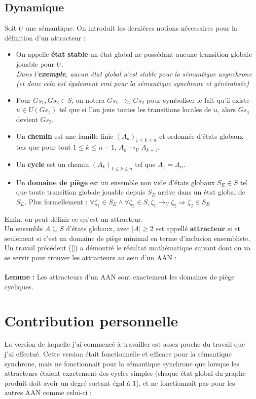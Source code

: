 \documentclass[12pt,a4paper]{article}
\begin{document}
\subsection{Dynamique}
Soit $U$ une sémantique. On introduit les dernières notions nécessaires pour la définition d'un attracteur :
\begin{itemize}
	\item On appelle \textbf{état stable} un état global ne possédant aucune transition globale jouable pour $U$.\\
	\emph{Dans l'\textbf{exemple}, aucun état global n'est stable pour la sémantique asynchrone (et donc cela est également vrai pour la sémantique synchrone et généralisée)}
	\item Pour $Gs_1,Gs_2\in S$, on notera $Gs_1\rightarrow _UGs_2$ pour symboliser le fait qu'il existe $u\in U(Gs_1)$ tel que si l'on joue toutes les transitions locales de $u$, alors $Gs_1$ devient $Gs_2$.
	\item Un \textbf{chemin} est une famille finie $(A_k)_{1\leq k\leq n}$ et ordonnée d'états globaux tels que pour tout $1\leq k\leq n-1$, $A_k\rightarrow _U A_{k+1}$.
	\item Un \textbf{cycle} est un chemin $(A_k)_{1\leq k\leq n}$ tel que $A_1=A_n$.
	\item Un \textbf{domaine de piège} est un ensemble non vide d'états globaux $S_E\in S$ tel que toute transition globale jouable depuis $S_E$ arrive dans un état global de $S_E$. Plus formellement : 
	$\forall\zeta _1\in S_E \wedge\forall\zeta _2\in S, \zeta _1 \rightarrow _U\zeta _2 \Rightarrow\zeta _2\in S_E$
\end{itemize}
Enfin, on peut définir ce qu'est un attracteur.\\
Un ensemble $A\subseteq S$ d'états globaux, avec $|A|\geq2$ est appellé \textbf{attracteur} si et seulement si c'est un domaine de piège minimal en terme d'inclusion ensembliste.\\
Un travail précédent ([\cite{chapitre}]) a démontré le résultat mathématique suivant dont on va se servir pour trouver les attracteurs au sein d'un AAN :\\ \\
\textbf{Lemme :} Les attracteurs d'un AAN sont exactement les domaines de piège cycliques.

\section{Contribution personnelle}
La version de laquelle j'ai commencé à travailler est assez proche du travail que j'ai effectué. Cette version était fonctionnelle et efficace pour la sémantique synchrone, mais ne fonctionnait pour la sémantique synchrone que 
lorsque les attracteurs étaient exactement des cycles simples (chaque état global du graphe produit doit avoir un degré sortant égal à $1$), et ne fonctionnait pas pour les autres AAN comme celui-ci :
\end{document}
